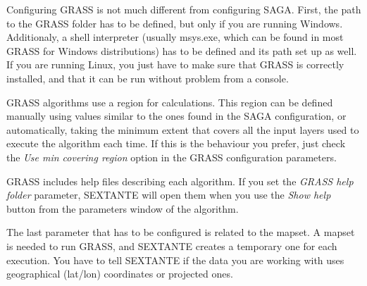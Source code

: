 Configuring GRASS is not much different from configuring SAGA. First, the path to the GRASS folder has to be defined, but only if you are running Windows. Additionaly, a shell interpreter (usually msys.exe, which can be found in most GRASS for Windows distributions) has to be defined and its path set up as well. If you are running Linux, you just have to make sure that GRASS is correctly installed, and that it can be run without problem from a console.

GRASS algorithms use a region for calculations. This region can be defined manually using values similar to the ones found in the SAGA configuration, or automatically, taking the minimum extent that covers all the input layers used to execute the algorithm each time. If this is the behaviour you prefer, just check the \emph{Use min covering region} option in the GRASS configuration parameters.

GRASS includes help files describing each algorithm. If you set the \emph{GRASS help folder} parameter, SEXTANTE will open them when you use the \emph{Show help} button from the parameters window of the algorithm.

The last parameter that has to be configured is related to the mapset. A mapset is needed to run GRASS, and SEXTANTE creates a temporary one for each execution. You have to tell SEXTANTE if the data you are working with uses geographical (lat/lon) coordinates or projected ones.










